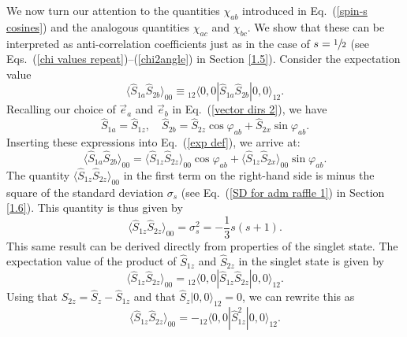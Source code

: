 We now turn our attention to the quantities $\chi_{ab}$ introduced in Eq.\ (\ref{spin-s cosines}) and the analogous quantities $\chi_{ac}$ and $\chi_{bc}$. We show that these can be interpreted as anti-correlation coefficients just as in the case of $s = \sfrac12$ (see Eqs.\ (\ref{chi values repeat})--(\ref{chi2angle}) in Section \ref{1.5}). Consider the expectation value
\begin{equation}
\langle \hat{S}_{1a}\hat{S}_{2b}\rangle_{00}\equiv {_{12\!}}\langle 0,0|\hat{S}_{1a}\hat{S}_{2b}|0,0\rangle_{12}.
\label{exp def}
\end{equation}
Recalling our choice of $\vec{e}_a$ and $\vec{e}_b$ in Eq.\ (\ref{vector dirs 2}), we have
\begin{equation}
\hat{S}_{1a} = \hat{S}_{1z}, \quad \hat{S}_{2b} = \hat{S}_{2z}  \cos{\varphi_{ab}} + \hat{S}_{2x}  \sin{\varphi_{ab}}. 
\label{rewriting Sa and Sb}
\end{equation}
Inserting these expressions into Eq.\ (\ref{exp def}), we arrive at:
\begin{equation}
\langle \hat{S}_{1a}\hat{S}_{2b}\rangle_{00} = \langle \hat{S}_{1z}\hat{S}_{2z}\rangle_{00} \cos\varphi_{ab}+\langle \hat{S}_{1z}\hat{S}_{2x}\rangle_{00} \sin \varphi_{ab}.
\label{exp value 1}
\end{equation}
The quantity $\langle \hat{S}_{1z}\hat{S}_{2z}\rangle_{00}$ in the first term on the right-hand side is minus the square of the standard deviation $\sigma_s$ (see Eq.\ (\ref{SD for adm raffle 1}) in Section \ref{1.6}). This quantity is thus given by
\begin{equation}
\langle \hat{S}_{1z}\hat{S}_{2z}\rangle_{00} = \sigma_s^2 = - \frac13 s(s+1).
\label{SD for singlet state}
\end{equation}
This same result can be derived directly from properties of the singlet state. The expectation value of the product of $\hat{S}_{1z}$ and $\hat{S}_{2z}$ in the singlet state is given by
\begin{equation}
\langle \hat{S}_{1z} \hat{S}_{2z} \rangle_{00}  = {_{12\!}}\langle 0,0| \hat{S}_{1z}\hat{S}_{2z}|0,0\rangle_{\!12}.
\label{aa product prob 1}  
\end{equation}
Using that $\hat{S}_{2z} = \hat{S}_z - \hat{S}_{1z}$ and that $\hat{S}_z  |0,0\rangle_{\!12} = 0$, we can rewrite this as
\begin{equation}
\langle \hat{S}_{1z} \hat{S}_{2z} \rangle_{00} = -{_{12\!}}\langle 0,0| \hat{S}_{1z}^2|0,0\rangle_{12}.
\label{aa product prob 2} 
\end{equation}
